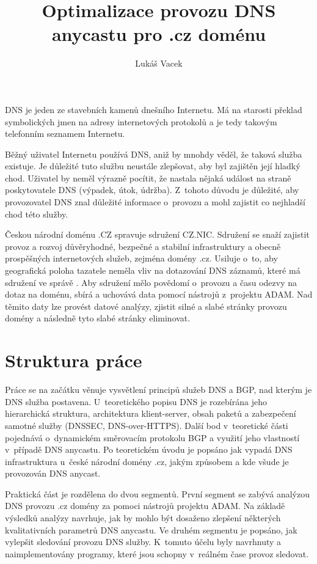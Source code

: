 \documentclass[thesis=M,czech]{src/FITthesis}[2019/12/23]
\title{Optimalizace provozu DNS anycastu pro .cz doménu}
\author{Lukáš Vacek} %
\begin{document}

\begin{introduction}
DNS je jeden ze stavebních kamenů dnešního Internetu. Má na starosti překlad symbolických jmen na adresy internetových protokolů a je tedy takovým telefonním seznamem Internetu. 

Běžný uživatel Internetu používá DNS, aniž by mnohdy věděl, že taková služba existuje. Je důležité tuto službu neustále zlepšovat, aby byl zajištěn její hladký chod. Uživatel by neměl výrazně pocítit, že nastala nějaká událost na straně poskytovatele DNS  (výpadek, útok, údržba). Z~tohoto důvodu je důležité, aby provozovatel DNS znal důležité informace o~provozu a mohl zajistit co nejhladší chod této služby. 

Českou národní doménu .CZ spravuje sdružení CZ.NIC. Sdružení se snaží zajistit provoz a rozvoj důvěryhodné, bezpečné a stabilní infrastruktury a obecně prospěšných internetových služeb, zejména domény .cz. Usiluje o~to, aby geografická poloha tazatele neměla vliv na dotazování DNS záznamů, které má sdružení ve správě . Aby sdružení mělo povědomí o~provozu a času odezvy na dotaz na doménu, sbírá a uchovává data pomocí nástrojů z~projektu ADAM. Nad těmito daty lze provést datové analýzy, zjistit silné a slabé stránky provozu domény a následně tyto slabé stránky eliminovat.

\section{Struktura práce}
Práce se na začátku věnuje vysvětlení principů služeb DNS a BGP, nad kterým je DNS služba postavena. U~teoretického popisu DNS je rozebírána jeho hierarchická struktura, architektura klient-server, obsah paketů a zabezpečení samotné služby (DNSSEC, DNS-over-HTTPS). Další bod v~teoretické části pojednává o~dynamickém směrovacím protokolu BGP a využití jeho vlastností v~případě DNS anycastu. Po teoretickém úvodu je popsáno jak vypadá DNS infrastruktura u~české národní domény .cz, jakým způsobem a kde všude je provozován DNS anycast. 

Praktická část je rozdělena do dvou segmentů. První segment se zabývá analýzou DNS provozu .cz domény za pomoci nástrojů projektu ADAM. Na základě výsledků analýzy navrhuje, jak by mohlo být dosaženo zlepšení \linebreak některých kvalitativních parametrů DNS anycastu.
Ve druhém segmentu je popsáno, jak vylepšit sledování provozu DNS služby. K~tomuto účelu byly navrhnuty a naimplementovány programy, které jsou schopny v~reálném čase provoz sledovat. 

\end{introduction}
\end{document}
